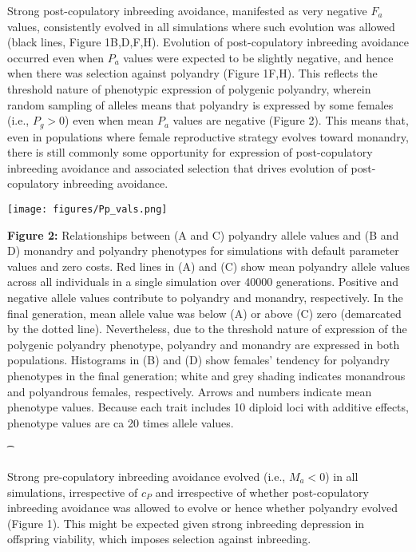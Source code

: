 \documentclass[10pt,letterpaper]{article}
\begin{document}
Strong post-copulatory inbreeding avoidance, manifested as very negative $F_{a}$ values, consistently evolved in all simulations where such evolution was allowed (black lines, Figure 1B,D,F,H). Evolution of post-copulatory inbreeding avoidance occurred even when $P_{a}$ values were expected to be slightly negative, and hence when there was selection against polyandry (Figure 1F,H). This reflects the threshold nature of phenotypic expression of polygenic polyandry, wherein random sampling of alleles means that polyandry is expressed by some females (i.e., $P_{g}>0$) even when mean $P_{a}$ values are negative (Figure 2). This means that, even in populations where female reproductive strategy evolves toward monandry, there is still commonly some opportunity for expression of post-copulatory inbreeding avoidance and associated selection that drives evolution of post-copulatory inbreeding avoidance.

{\color{Gray}
\begin{adjustwidth}{-2.2in}{0in}
{
   \texttt{[image: figures/Pp\_vals.png]}%
}
{%
   \begin{justify}\vspace{0.75 mm} \textbf{Figure 2:} Relationships between (A and C) polyandry allele values and (B and D) monandry and polyandry phenotypes for simulations with default parameter values and zero costs. Red lines in (A) and (C) show mean polyandry allele values across all individuals in a single simulation over 40000 generations. Positive and negative allele values contribute to polyandry and monandry, respectively. In the final generation, mean allele value was below (A) or above (C) zero (demarcated by the dotted line). Nevertheless, due to the threshold nature of expression of the polygenic polyandry phenotype, polyandry and monandry are expressed in both populations. Histograms in (B) and (D) show females' tendency for polyandry phenotypes in the final generation; white and grey shading indicates monandrous and polyandrous females, respectively. Arrows and numbers indicate mean phenotype values. Because each trait includes 10 diploid loci with additive effects, phenotype values are ca 20 times allele values.  \end{justify}{\t}%
}
\end{adjustwidth}
}

Strong pre-copulatory inbreeding avoidance evolved (i.e., $M_{a}<0$) in all simulations, irrespective of $c_{P}$ and irrespective of whether post-copulatory inbreeding avoidance was allowed to evolve or hence whether polyandry evolved (Figure 1). This might be expected given strong inbreeding depression in offspring viability, which imposes selection against inbreeding.
\end{document}
